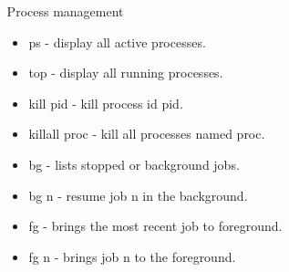 \documentclass[final,t]{beamer}
\begin{document}
\begin{frame}[fragile]{}
\begin{columns}[t]
\begin{column}{.32\linewidth}
\begin{columns}[t]
\begin{column}{.48\linewidth}
      \end{column}
     \hspace*{-0.8cm}
     \begin{column}{.49\linewidth}
      \begin{block}{Process management}
      \begin{itemize}
         \item ps - display all active processes.
         \item top - display all running processes.
         \item kill pid - kill process id pid.
         \item killall proc - kill all processes named proc.
         \item bg - lists stopped or background jobs.
         \item bg n - resume job n in the background.
         \item fg - brings the most recent job to foreground.
         \item fg n - brings job n to the foreground.
        \end{itemize}
      \end{block}
      \end{column}
  \end{columns}
   

    \end{column}
  \end{columns}
\end{frame}
\end{document}
